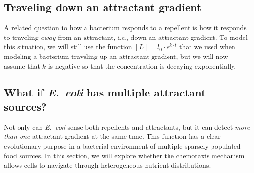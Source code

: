 \begin{exercise}\end{exercise}

\subsection{Traveling down an attractant gradient}

A related question to how a bacterium responds to a repellent is how it responds to traveling \textit{away} from an attractant, i.e., down an attractant gradient. To model this situation, we will still use the function $[L] = l_0 \cdot e^{k \cdot t}$ that we used when modeling a bacterium traveling up an attractant gradient, but we will now assume that $k$ is negative so that the concentration is decaying exponentially.\\

\begin{exercise}\end{exercise}

\subsection{What if \textit{E.~coli} has multiple attractant sources?}

Not only can \textit{E.~coli} sense both repellents and attractants, but it can detect \textit{more than one} attractant gradient at the same time.  This function has a clear evolutionary purpose in a bacterial environment of multiple sparsely populated food sources. In this section, we will explore whether the chemotaxis mechanism allows cells to navigate through heterogeneous nutrient distributions.\\

